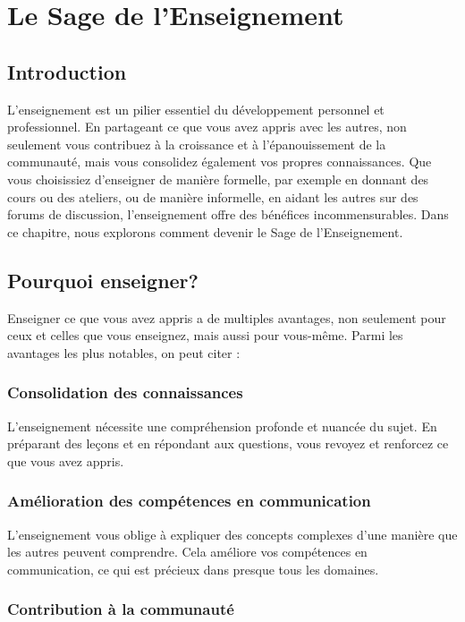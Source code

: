 \chapter{Le Sage de l'Enseignement}

\section{Introduction}

L'enseignement est un pilier essentiel du développement personnel et professionnel. En partageant ce que vous avez appris avec les autres, non seulement vous contribuez à la croissance et à l'épanouissement de la communauté, mais vous consolidez également vos propres connaissances. Que vous choisissiez d'enseigner de manière formelle, par exemple en donnant des cours ou des ateliers, ou de manière informelle, en aidant les autres sur des forums de discussion, l'enseignement offre des bénéfices incommensurables. Dans ce chapitre, nous explorons comment devenir le Sage de l'Enseignement.

\section{Pourquoi enseigner?}

Enseigner ce que vous avez appris a de multiples avantages, non seulement pour ceux et celles que vous enseignez, mais aussi pour vous-même. Parmi les avantages les plus notables, on peut citer :

\subsection{Consolidation des connaissances}

L'enseignement nécessite une compréhension profonde et nuancée du sujet. En préparant des leçons et en répondant aux questions, vous revoyez et renforcez ce que vous avez appris.

\subsection{Amélioration des compétences en communication}

L'enseignement vous oblige à expliquer des concepts complexes d'une manière que les autres peuvent comprendre. Cela améliore vos compétences en communication, ce qui est précieux dans presque tous les domaines.

\subsection{Contribution à la communauté}

